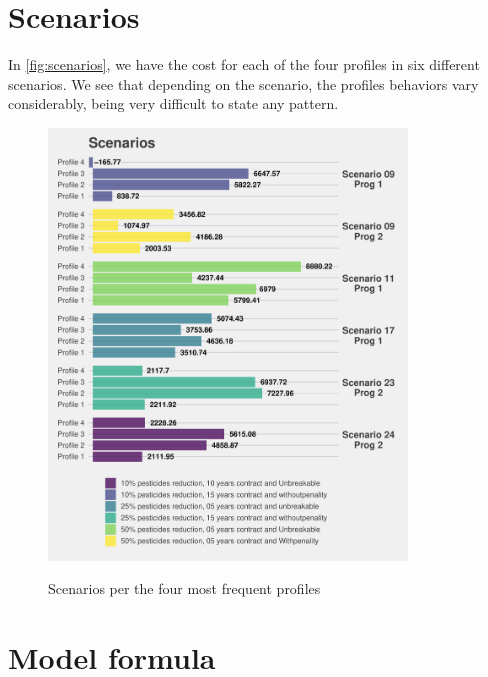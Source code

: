 \documentclass[12pt]{article}
\begin{document}
\section*{Scenarios}

In \autoref{fig:scenarios}, we have the cost for each of the four
profiles in six different scenarios. We see that depending on the
scenario, the profiles behaviors vary considerably, being very difficult
to state any pattern.

\begin{figure}[H]
 \centering
 \includegraphics[width=0.85\textwidth]{figures/scenarios.pdf}\\
 \caption{Scenarios per the four most frequent profiles}
 \label{fig:scenarios}
\end{figure}

\section*{Model formula}
\end{document}
